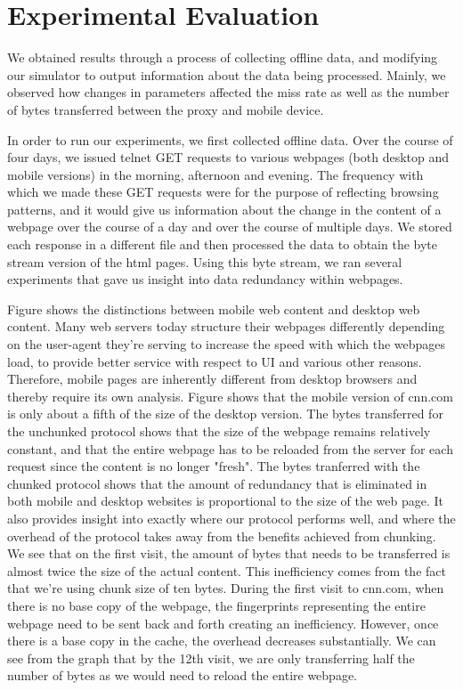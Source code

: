 \section{Experimental Evaluation}
\label{sec:eval}

We obtained results through a process of collecting offline data, and modifying our simulator to output information about the data being processed. Mainly, we observed how changes in parameters affected the miss rate as well as the number of bytes transferred between the proxy and mobile device.

In order to run our experiments, we first collected offline data. Over the course of four days, we issued telnet GET requests to various webpages (both desktop and mobile versions) in the morning, afternoon and evening. The frequency with which we made these GET requests were for the purpose of reflecting browsing patterns, and it would give us information about the change in the content of a webpage over the course of a day and over the course of multiple days. We stored each response in a different file and then processed the data to obtain the byte stream version of the html pages. Using this byte stream, we ran several experiments that gave us insight into data redundancy within webpages.

Figure shows the distinctions between mobile web content and desktop web content. Many web servers today structure their webpages differently depending on the user-agent they're serving to increase the speed with which the webpages load, to provide better service with respect to UI and various other reasons. Therefore, mobile pages are inherently different from desktop browsers and thereby require its own analysis. Figure shows that the mobile version of cnn.com is only about a fifth of the size of the desktop version. The bytes transferred for the unchunked protocol shows that the size of the webpage remains relatively constant, and that the entire webpage has to be reloaded from the server for each request since the content is no longer "fresh". The bytes tranferred with the chunked protocol shows that the amount of redundancy that is eliminated in both mobile and desktop websites is proportional to the size of the web page. It also provides insight into exactly where our protocol performs well, and where the overhead of the protocol takes away from the benefits achieved from chunking. We see that on the first visit, the amount of bytes that needs to be transferred is almost twice the size of the actual content. This inefficiency comes from the fact that we're using chunk size of ten bytes. During the first visit to cnn.com, when there is no base copy of the webpage, the fingerprints representing the entire webpage need to be sent back and forth creating an inefficiency. However, once there is a base copy in the cache, the overhead decreases substantially. We can see from the graph that by the 12th visit, we are only transferring half the number of bytes as we would need to reload the entire webpage. 

